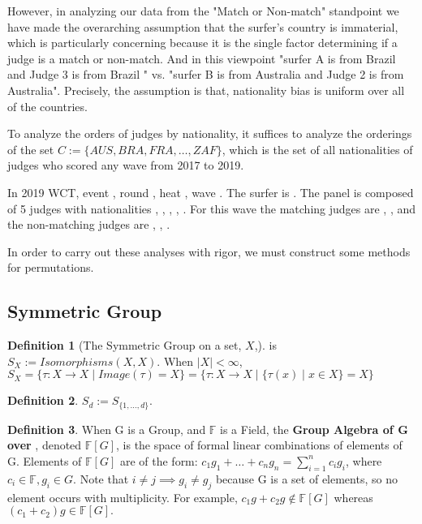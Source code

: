 \documentclass{article}
\theoremstyle{definition}
\newtheorem{definition}{Definition}
\begin{document}
However, in analyzing our data from the "Match or Non-match" standpoint we have made the overarching assumption that the  surfer's country is immaterial, which is particularly concerning because it is the single factor determining if a judge is a match or non-match. And in this viewpoint "surfer A is from Brazil and Judge 3 is from Brazil " vs. "surfer B is from Australia and Judge 2 is from Australia". Precisely, the assumption is that, nationality bias is uniform over all of the countries. 

To analyze the orders of judges by nationality, it suffices to analyze the orderings of the set $C := \{AUS, BRA, FRA, \dots, ZAF\}$, which is the set of all nationalities of judges who scored any wave from 2017 to 2019.

In 2019 WCT, event      , round     , heat   , wave    . The surfer is     . The panel is composed of 5 judges with nationalities {  ,  ,  ,  ,  }. For this wave the matching judges are { , }, and the non-matching judges are { , , }.

In order to carry out these analyses with rigor, we must construct some methods for permutations.

\subsection{Symmetric Group}
\begin{definition}[The Symmetric Group on a set, $X$,] is $S_X := Isomorphisms(X,X)$. When $|X|<\infty$, $S_X = \{ \tau :X\rightarrow X \mid Image(\tau) = X \}  = \{\tau:X\rightarrow X \mid \{\tau(x) \mid x \in X\} = X \} $
\end{definition}
\begin{definition} $S_d := S_{\{ 1 ,\dots, d\}}. $\end{definition}

\begin{definition}When G is a Group, and $\mathbb{F}$ is a Field, the \textbf{Group Algebra of G over }, denoted $\mathbb{F}[G]$, is the space of formal linear combinations of elements of G. Elements of $\mathbb{F}[G]$ are of the form: $c_1 g_1 + \dots + c_n g_n = \sum^n_{i=1} c_i g_i$, where $c_i \in \mathbb{F}, g_i \in G$. Note that $i\neq j \implies g_i \neq g_j$ because G is a set of elements, so no element occurs with multiplicity. For example, $c_1 g + c_2 g \not\in \mathbb{F}[G]$ whereas $(c_1 + c_2)g \in \mathbb{F}[G]. $\end{definition}
\end{document}

